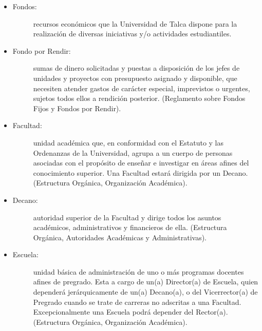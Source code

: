 \begin{itemize}
	\item 	\begin{description}
			    \item[Fondos:] recursos  económicos  que  la  Universidad  de  Talca  dispone  para  la  realización  de diversas iniciativas y/o actividades estudiantiles. \cite{1}
			\end{description}

	\item 	\begin{description}
			    \item[Fondo por Rendir:] sumas de dinero solicitadas y puestas a disposición de los jefes de unidades y proyectos con presupuesto asignado y disponible, que necesiten atender gastos de carácter especial, imprevistos o urgentes, sujetos todos ellos a rendición posterior. (Reglamento sobre Fondos Fijos y Fondos por Rendir). \cite{1}
			\end{description}

	\item 	\begin{description}
			    \item[Facultad:] unidad académica que, en conformidad con el Estatuto y las Ordenanzas de la Universidad, agrupa a un cuerpo de personas asociadas con el propósito de enseñar e investigar en áreas afines del conocimiento superior. Una Facultad estará dirigida por un Decano. (Estructura Orgánica, Organización Académica). \cite{1}
			\end{description}

	\item 	\begin{description}
			    \item[Decano:] autoridad superior de la Facultad y dirige todos los asuntos académicos, administrativos y financieros de ella. (Estructura Orgánica, Autoridades Académicas y Administrativas). \cite{1}
			\end{description}

	\item 	\begin{description}
			    \item[Escuela:] unidad básica de administración de uno o más programas docentes afines de pregrado. Esta a cargo de un(a) Director(a) de Escuela, quien dependerá jerárquicamente de un(a) Decano(a), o del Vicerrector(a) de Pregrado cuando se trate de carreras no adscritas a una Facultad. Excepcionalmente una Escuela podrá depender del Rector(a). (Estructura Orgánica, Organización Académica). \cite{1}
			\end{description}


\end{itemize}
